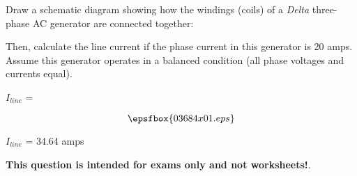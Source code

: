 

Draw a schematic diagram showing how the windings (coils) of a {\it Delta} three-phase AC generator are connected together:

\vskip 100pt

Then, calculate the line current if the phase current in this generator is 20 amps.  Assume this generator operates in a balanced condition (all phase voltages and currents equal).

\vskip 10pt

$I_{line}$ = 







$$\epsfbox{03684x01.eps}$$

$I_{line}$ = 34.64 amps







{\bf This question is intended for exams only and not worksheets!}.



